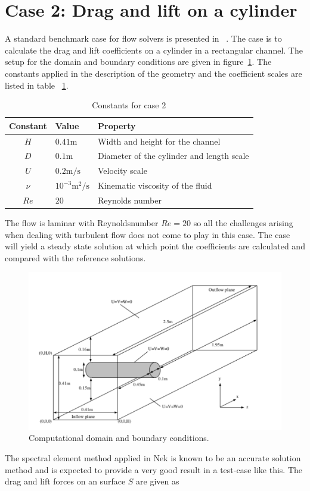 \section{Case 2: Drag and lift on a cylinder}
A standard benchmark case for flow solvers is presented in ~\cite{benchmark}.
The case is to calculate the drag and lift coefficients on a cylinder in a rectangular channel.
The setup for the domain and boundary conditions are given in figure~\ref{fig:cylinder}.
The constants applied in the description of the geometry and the coefficient scales are listed 
in table ~\ref{tab:case2consts}.
%
\begin{table}[h]
    \centering
    \begin{tabular}{c l l}
     Constant & Value & Property \\ \hline
    $H$ & $0.41\text{m}$ & Width and height for the channel \\
    $D$ & $0.1\text{m}$ & Diameter of the cylinder and length scale \\
    $U$ & $0.2\text{m/s}$ & Velocity scale \\
    $\nu$ &  $ 10^{-3}\text{m$^2$/s}$ & Kinematic viscosity of the fluid \\
    $Re$ & $20$ & Reynolds number \\ 
    \end{tabular}
    \caption{Constants for case 2}
    \label{tab:case2consts}
\end{table}
%
The flow is laminar with Reynoldsnumber $Re=20$ so all the 
challenges arising when dealing with turbulent flow does not come to play in this case. 
The case will yield a steady state solution at which point the coefficients are calculated
and compared with the reference solutions.
\begin{figure}[h]
    \centering
    \includegraphics[width = 1.0\textwidth]{Figures/cylinder.pdf}
    \caption{Computational domain and boundary conditions.}
    \label{fig:cylinder}
\end{figure}
The spectral element method applied in Nek is known to be an accurate
solution method and is expected to 
provide a very good result in a test-case like this.
The drag and lift forces on an surface $S$ are given as 

